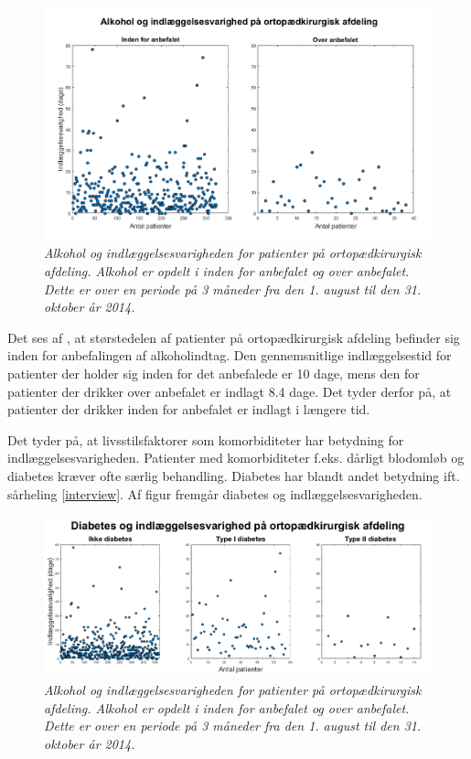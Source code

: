 \begin{figure}[H]
	\centering
	\includegraphics[scale=0.55]{figures/alkohologindlaeg}
	\caption{\textit{Alkohol og indlæggelsesvarigheden for patienter på ortopædkirurgisk afdeling. Alkohol er opdelt i inden for anbefalet og over anbefalet. Dette er over en periode på 3 måneder fra den 1. august til den 31. oktober år 2014. }}
	\label{alkohologindlaeggelse}
\end{figure}


\noindent
Det ses af , at størstedelen af patienter på ortopædkirurgisk afdeling befinder sig inden for anbefalingen af alkoholindtag. Den gennemsnitlige indlæggelsestid for patienter der holder sig inden for det anbefalede er 10 dage, mens den for patienter der drikker over anbefalet er indlagt 8.4 dage. Det tyder derfor på, at patienter der drikker inden for anbefalet er indlagt i længere tid. 

Det tyder på, at livsstilsfaktorer som komorbiditeter har betydning for indlæggelsesvarigheden. Patienter med komorbiditeter f.eks. dårligt blodomløb og diabetes kræver ofte særlig behandling. Diabetes har blandt andet betydning ift. sårheling \ref{interview}. Af figur  fremgår diabetes og indlæggelsesvarigheden. 

\begin{figure}[H]
	\centering
	\includegraphics[scale=0.55]{figures/diabetesogindlaeg}
	\caption{\textit{Alkohol og indlæggelsesvarigheden for patienter på ortopædkirurgisk afdeling. Alkohol er opdelt i inden for anbefalet og over anbefalet. Dette er over en periode på 3 måneder fra den 1. august til den 31. oktober år 2014. }}
	\label{diabetesogindlaeggelse}
\end{figure}

